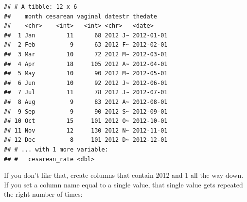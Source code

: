 \documentclass[]{tufte-book}
\newenvironment{Shaded}{}{}
\newcommand{\DataTypeTok}[1]{\textcolor[rgb]{0.56,0.13,0.00}{#1}}
\newcommand{\DecValTok}[1]{\textcolor[rgb]{0.25,0.63,0.44}{#1}}
\newcommand{\KeywordTok}[1]{\textcolor[rgb]{0.00,0.44,0.13}{\textbf{#1}}}
\newcommand{\NormalTok}[1]{#1}
\newcommand{\OperatorTok}[1]{\textcolor[rgb]{0.40,0.40,0.40}{#1}}
\newcommand{\StringTok}[1]{\textcolor[rgb]{0.25,0.44,0.63}{#1}}
\theoremstyle{definition}
\theoremstyle{definition}
\theoremstyle{definition}
\theoremstyle{remark}
\begin{document}
\begin{Shaded}
\end{Shaded}

\begin{verbatim}
## # A tibble: 12 x 6
##    month cesarean vaginal datestr thedate   
##    <chr>    <int>   <int> <chr>   <date>    
##  1 Jan         11      68 2012 J~ 2012-01-01
##  2 Feb          9      63 2012 F~ 2012-02-01
##  3 Mar         10      72 2012 M~ 2012-03-01
##  4 Apr         18     105 2012 A~ 2012-04-01
##  5 May         10      90 2012 M~ 2012-05-01
##  6 Jun         10      92 2012 J~ 2012-06-01
##  7 Jul         11      78 2012 J~ 2012-07-01
##  8 Aug          9      83 2012 A~ 2012-08-01
##  9 Sep          9      90 2012 S~ 2012-09-01
## 10 Oct         15     101 2012 O~ 2012-10-01
## 11 Nov         12     130 2012 N~ 2012-11-01
## 12 Dec          8     101 2012 D~ 2012-12-01
## # ... with 1 more variable:
## #   cesarean_rate <dbl>
\end{verbatim}

If you don't like that, create columns that contain 2012 and 1 all the
way down. If you set a column name equal to a single value, that single
value gets repeated the right number of times:

\begin{Shaded}
\end{Shaded}
\end{document}
